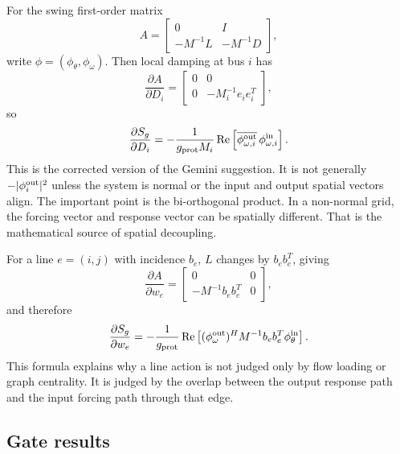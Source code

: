 \documentclass[11pt]{article}
\newcommand{\Real}{\operatorname{Re}}
\begin{document}
For the swing first-order matrix
\[
A=\begin{bmatrix}
0&I\\
-M^{-1}L&-M^{-1}D
\end{bmatrix},
\]
write $\phi=(\phi_\theta,\phi_\omega)$. Then local damping at bus $i$ has
\begin{equation}
  \frac{\partial A}{\partial D_i}
  =
  \begin{bmatrix}
  0&0\\
  0&-M_i^{-1}e_ie_i^T
  \end{bmatrix},
  \label{eq:dA-dD}
\end{equation}
so
\begin{equation}
  \frac{\partial S_g}{\partial D_i}
  =
  -\frac{1}{g_{\rm prot}M_i}
  \Real\left[
  \overline{\phi^{\rm out}_{\omega,i}}\,
  \phi^{\rm in}_{\omega,i}
  \right].
  \label{eq:damping-resolvent-placement}
\end{equation}
This is the corrected version of the Gemini suggestion. It is not generally
$-|\phi_i^{\rm out}|^2$ unless the system is normal or the input and output
spatial vectors align. The important point is the bi-orthogonal product. In a
non-normal grid, the forcing vector and response vector can be spatially
different. That is the mathematical source of spatial decoupling.

For a line $e=(i,j)$ with incidence $b_e$, $L$ changes by $b_eb_e^T$, giving
\begin{equation}
  \frac{\partial A}{\partial w_e}
  =
  \begin{bmatrix}
  0&0\\
  -M^{-1}b_eb_e^T&0
  \end{bmatrix},
  \label{eq:dA-dw}
\end{equation}
and therefore
\begin{equation}
  \frac{\partial S_g}{\partial w_e}
  =
  -\frac{1}{g_{\rm prot}}
  \Real\left[
  (\phi^{\rm out}_\omega)^H
  M^{-1}b_e b_e^T
  \phi^{\rm in}_\theta
  \right].
  \label{eq:line-resolvent-placement}
\end{equation}
This formula explains why a line action is not judged only by flow loading or
graph centrality. It is judged by the overlap between the output response path
and the input forcing path through that edge.

\subsection{Gate results}
\end{document}
